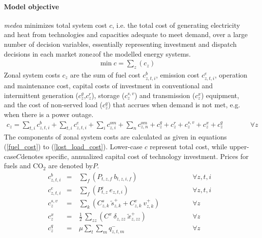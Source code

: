 \documentclass[review, 3p, times, 12pt]{elsarticle} %
\newcommand{\COO}{\ensuremath{\mathrm{CO_2}} }
\begin{document}
\paragraph{Model objective}
\emph{medea} minimizes total system cost $c$, i.e. the total cost of generating electricity and heat from
technologies and capacities adequate to meet demand, over a large number of decision variables, essentially
representing investment and dispatch decisions in each market zone$z$of the modelled energy systems.
\begin{align}
\min c =\sum_{z} (c_{z})
\end{align}
Zonal system costs $c_{z}$ are the sum of fuel cost $c^{b}_{z,t,i}$, emission cost $c^{e}_{z,t,i}$, operation and
maintenance cost, capital costs of investment in conventional and intermittent generation ($c^{g}_{z}$,$c^{r}_{z}$),
storage ($c^{s,v}_{z}$) and transmission ($c^{x}_{z}$) equipment, and the cost of non-served load ($c^{q}_{z}$) that
accrues when demand is not met, e.g. when there is a power outage.
\begin{align}
c_{z} =\sum_{t,i}  c^{b}_{z,t,i} +\sum_{t,i} c^{e}_{z,t,i} +\sum_{i} c^{om}_{z,i} +\sum_{n} c^{om}_{z,n} + c^{g}_{z} +
c^{r}_{z} + c^{s,v}_{z} + c^{x}_{z} + c^{q}_{z} \qquad \qquad \forall z
\end{align}
The components of zonal system costs are calculated as given in equations (\ref{fuel_cost}) to (\ref{lost_load_cost}).
Lower-case $c$ represent total cost, while upper-case$C$denotes specific, annualized capital cost of technology investment.
Prices for fuels and \COO are denoted by$P$.
\begin{align}
&c^{b}_{z,t,i}& =&\ \sum_{f}\left( P_{t,z,f}\:b_{t,z,i,f}\right)\qquad \qquad&\forall z,t,i\label{fuel_cost}\\
&c^{e}_{z,t,i}& =&\ \sum_{f}\left( P^{e}_{t,z}\:e_{z,t,i}\right)\qquad \qquad&\forall z,t,i\\
&c^{s,v}_{z}& =&\ \sum_{k}\left( C^{s}_{z,k}\: \widetilde{s}^{+}_{z,k} + C^{v}_{z,k} \:v^{+}_{z,k}\right)\qquad \qquad&\forall z\\
&c^{x}_{z}& =&\ \frac{1}{2}\: \sum_{zz} (C^{x}\: \delta_{z,zz}\: \widetilde{x}^{+}_{z,zz})\qquad \qquad&\forall z\label{transmission_expansion_cost}\\
&c^{q}_{z}& =&\ \mu \sum_{t}\sum_{m} q^{-}_{z,t,m}\qquad \qquad&\forall z\label{lost_load_cost}
\end{align}
\end{document}
